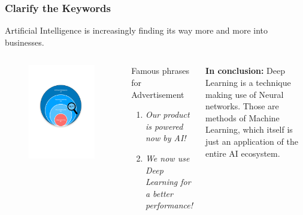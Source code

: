 \documentclass{beamer}
\begin{document}
\begin{frame}
\frametitle{Clarify the Keywords}
Artificial Intelligence is increasingly finding its way more and more into businesses. 
\begin{columns}
	\begin{figure}
		\includegraphics[width=1.15\linewidth]{photo/intro_0}
	\end{figure}
	\begin{block}{Famous phrases for Advertisement}
		\begin{enumerate}
			\item \textit{Our product is powered now by AI!} 
			\item \textit{We now use Deep Learning for a better performance!}
		\end{enumerate}
	\end{block}
\textbf{In conclusion:} Deep Learning is a technique making use of Neural networks. Those are methods of Machine Learning, which 
 itself is just an application of the entire AI ecosystem.
\end{columns}
\end{frame}
\end{document}
